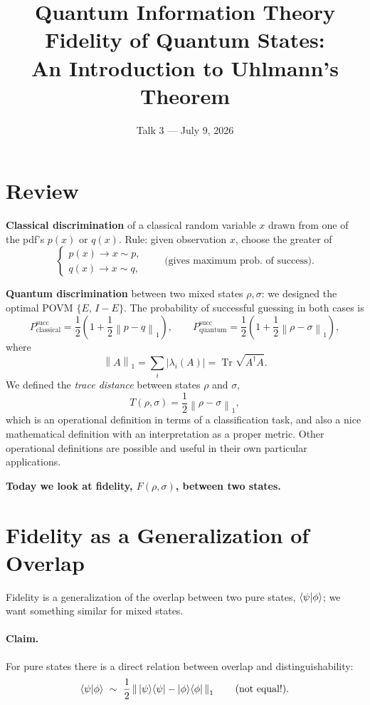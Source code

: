 \documentclass[11pt]{article}
\title{\textbf{Quantum Information Theory}\\[4pt]
Fidelity of Quantum States:\\
An Introduction to Uhlmann's Theorem}
\author{}
\date{Talk 3 --- July 9, 2026}
\newcommand{\Tr}{\operatorname{Tr}}
\newcommand{\onenorm}[1]{\left\lVert #1 \right\rVert_{1}}
\begin{document}
\maketitle

\section*{Review}

\textbf{Classical discrimination} of a classical random variable $x$ drawn
from one of the pdf's $p(x)$ or $q(x)$.
Rule: given observation $x$, choose the greater of
\[
\begin{cases}
p(x) \longrightarrow x\sim p,\\[2pt]
q(x) \longrightarrow x\sim q,
\end{cases}
\qquad
\Big(\text{gives maximum prob.\ of success}\Big).
\]

\textbf{Quantum discrimination} between two mixed states $\rho,\sigma$: we
designed the optimal POVM $\{E,\,I-E\}$. The probability of successful guessing
in both cases is
\[
P^{\mathrm{succ}}_{\mathrm{classical}}
= \frac12\!\left(1 + \frac12\onenorm{p-q}\right),
\qquad
P^{\mathrm{succ}}_{\mathrm{quantum}}
= \frac12\!\left(1 + \frac12\onenorm{\rho-\sigma}\right),
\]
where
\[
\onenorm{A} = \sum_i |\lambda_i(A)| = \Tr\sqrt{A^{\dagger}A}.
\]
We defined the \emph{trace distance} between states $\rho$ and $\sigma$,
\[
T(\rho,\sigma) = \frac12\onenorm{\rho-\sigma},
\]
which is an operational definition in terms of a classification task, and also
a nice mathematical definition with an interpretation as a proper metric. Other
operational definitions are possible and useful in their own particular
applications.

\medskip
\noindent\textbf{Today we look at fidelity, $F(\rho,\sigma)$, between two
states.}

\section{Fidelity as a Generalization of Overlap}

Fidelity is a generalization of the overlap between two pure states,
$\braket{\psi|\phi}$; we want something similar for mixed states.

\paragraph{Claim.}
For pure states there is a direct relation between overlap and
distinguishability:
\[
\braket{\psi|\phi}\ \sim\
\frac12\onenorm{\,\ket{\psi}\!\bra{\psi} - \ket{\phi}\!\bra{\phi}\,}
\qquad(\text{not equal!}).
\]
\end{document}
